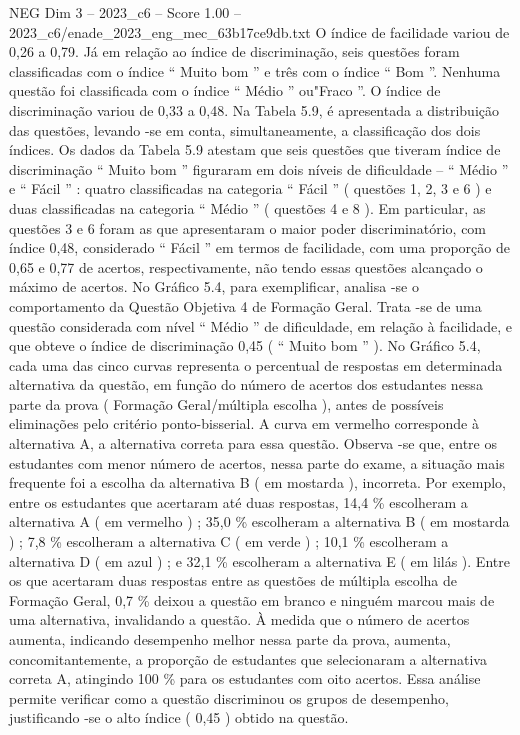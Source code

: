\begin{textsample}{NEG Dim 3 – 2023\_c6 – Score 1.00 – 2023\_c6/enade\_2023\_eng\_mec\_63b17ce9db.txt}
O índice de facilidade variou de 0,26 a 0,79.
Já em relação ao índice de discriminação, seis questões foram classificadas com o índice “ Muito bom ” e três com o índice “ Bom ”.
Nenhuma questão foi classificada com o índice “ Médio ” ou"Fraco ”.
O índice de discriminação variou de 0,33 a 0,48.
Na Tabela 5.9, é apresentada a distribuição das questões, levando -se em conta, simultaneamente, a classificação dos dois índices.
Os dados da Tabela 5.9 atestam que seis questões que tiveram índice de discriminação “ Muito bom ” figuraram em dois níveis de dificuldade – “ Médio ” e “ Fácil ” : quatro classificadas na categoria “ Fácil ” ( questões 1, 2, 3 e 6 ) e duas classificadas na categoria “ Médio ” ( questões 4 e 8 ).
Em particular, as questões 3 e 6 foram as que apresentaram o maior poder discriminatório, com índice 0,48, considerado “ Fácil ” em termos de facilidade, com uma proporção de 0,65 e 0,77 de acertos, respectivamente, não tendo essas questões alcançado o máximo de acertos.
No Gráfico 5.4, para exemplificar, analisa -se o comportamento da Questão Objetiva 4 de Formação Geral.
Trata -se de uma questão considerada com nível “ Médio ” de dificuldade, em relação à facilidade, e que obteve o índice de discriminação 0,45 ( “ Muito bom ” ).
No Gráfico 5.4, cada uma das cinco curvas representa o percentual de respostas em determinada alternativa da questão, em função do número de acertos dos estudantes nessa parte da prova ( Formação Geral/múltipla escolha ), antes de possíveis eliminações pelo critério ponto-bisserial.
A curva em vermelho corresponde à alternativa A, a alternativa correta para essa questão.
Observa -se que, entre os estudantes com menor número de acertos, nessa parte do exame, a situação mais frequente foi a escolha da alternativa B ( em mostarda ), incorreta.
Por exemplo, entre os estudantes que acertaram até duas respostas, 14,4 \% escolheram a alternativa A ( em vermelho ) ; 35,0 \% escolheram a alternativa B ( em mostarda ) ; 7,8 \% escolheram a alternativa C ( em verde ) ; 10,1 \% escolheram a alternativa D ( em azul ) ; e 32,1 \% escolheram a alternativa E ( em lilás ).
Entre os que acertaram duas respostas entre as questões de múltipla escolha de Formação Geral, 0,7 \% deixou a questão em branco e ninguém marcou mais de uma alternativa, invalidando a questão.
À medida que o número de acertos aumenta, indicando desempenho melhor nessa parte da prova, aumenta, concomitantemente, a proporção de estudantes que selecionaram a alternativa correta A, atingindo 100 \% para os estudantes com oito acertos.
Essa análise permite verificar como a questão discriminou os grupos de desempenho, justificando -se o alto índice ( 0,45 ) obtido na questão.

\end{textsample}
